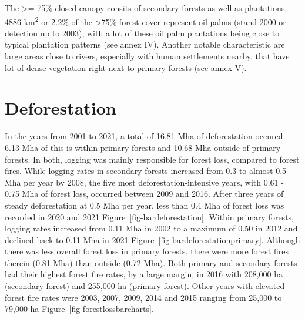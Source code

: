 \documentclass[
  letterpaper,
  DIV=11,
  numbers=noendperiod]{scrreprt}
\begin{document}
The \textgreater= 75\% closed canopy consits of secondary forests as
well as plantations. 4886 km\textsuperscript{2} or 2.2\% of the
\textgreater75\% forest cover represent oil palms (stand 2000 or
detection up to 2003), with a lot of these oil palm plantations being
close to typical plantation patterns (see annex IV). Another notable
characteristic are large areas close to rivers, especially with human
settlements nearby, that have lot of dense vegetation right next to
primary forests (see annex V).

\hypertarget{deforestation}{%
\section{Deforestation}\label{deforestation}}

In the years from 2001 to 2021, a total of 16.81 Mha of deforestation
occured. 6.13 Mha of this is within primary forests and 10.68 Mha
outside of primary forests. In both, logging was mainly responsible for
forest loss, compared to forest fires. While logging rates in secondary
forests increased from 0.3 to almost 0.5 Mha per year by 2008, the five
most deforestation-intensive years, with 0.61 - 0.75 Mha of forest loss,
occurred between 2009 and 2016. After three years of steady
deforestation at 0.5 Mha per year, less than 0.4 Mha of forest loss was
recorded in 2020 and 2021 Figure~\ref{fig-bardeforestation}. Within
primary forests, logging rates increased from 0.11 Mha in 2002 to a
maximum of 0.50 in 2012 and declined back to 0.11 Mha in 2021
Figure~\ref{fig-bardeforestationprimary}. Although there was less
overall forest loss in primary forests, there were more forest fires
therein (0.81 Mha) than outside (0.72 Mha). Both primary and secondary
forests had their highest forest fire rates, by a large margin, in 2016
with 208,000 ha (secondary forest) and 255,000 ha (primary forest).
Other years with elevated forest fire rates were 2003, 2007, 2009, 2014
and 2015 ranging from 25,000 to 79,000 ha
Figure~\ref{fig-forestlossbarcharts}.
\end{document}

